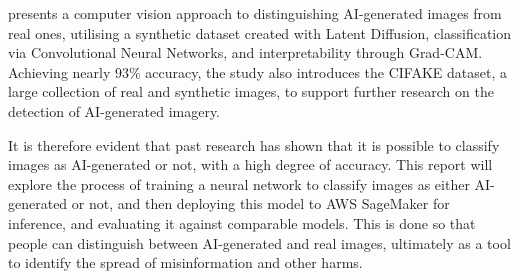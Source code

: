 \cite{bird2023cifakeimageclassificationexplainable} presents a computer vision approach to distinguishing AI-generated images from real ones, utilising a synthetic dataset created with Latent Diffusion, classification via Convolutional Neural Networks, and interpretability through Grad-CAM. Achieving nearly 93\% accuracy, the study also introduces the CIFAKE dataset, a large collection of real and synthetic images, to support further research on the detection of AI-generated imagery.

It is therefore evident that past research has shown that it is possible to classify images as AI-generated or not, with a high degree of accuracy. This report will explore the process of training a neural network to classify images as either AI-generated or not, and then deploying this model to AWS SageMaker for inference, and evaluating it against comparable models. This is done so that people can distinguish between AI-generated and real images, ultimately as a tool to identify the spread of misinformation and other harms.